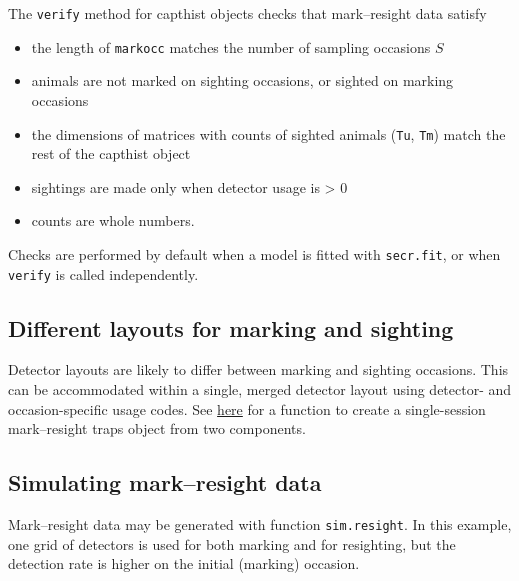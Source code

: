 \documentclass[
]{book}
\providecommand{\tightlist}{%
  \setlength{\itemsep}{0pt}\setlength{\parskip}{0pt}}
\begin{document}
The \texttt{verify} method for capthist objects checks that mark--resight data satisfy

\begin{itemize}
\tightlist
\item
  the length of \texttt{markocc} matches the number of sampling occasions \(S\)
\item
  animals are not marked on sighting occasions, or sighted on marking occasions
\item
  the dimensions of matrices with counts of sighted animals (\texttt{Tu}, \texttt{Tm}) match the rest of the capthist object
\item
  sightings are made only when detector usage is \textgreater{} 0
\item
  counts are whole numbers.
\end{itemize}

Checks are performed by default when a model is fitted with \texttt{secr.fit}, or when \texttt{verify} is called independently.

\subsection{Different layouts for marking and sighting}\label{different-layouts-for-marking-and-sighting}

Detector layouts are likely to differ between marking and sighting occasions. This can be accommodated within a single, merged detector layout using detector- and occasion-specific usage codes. See \hyperref[appendix3]{here} for a function to create a single-session mark--resight traps object from two components.

\subsection{Simulating mark--resight data}\label{simulating-markresight-data}

Mark--resight data may be generated with function \texttt{sim.resight}. In this example, one grid of detectors is used for both marking and for resighting, but the detection rate is higher on the initial (marking) occasion.
\end{document}

